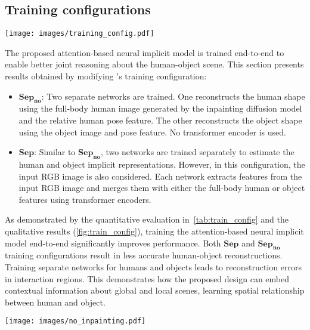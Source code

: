 \subsection{Training configurations}
\begin{table}[h]
\centering
\resizebox{\linewidth}{!}
{}
\vspace{-3mm}
\caption{Quantitative results obtained with different training configurations of \name.}
\label{tab:train_config}
\end{table}
\begin{figure*}[t]
  \centering
\texttt{[image: images/training\_config.pdf]}
\caption{Examples of results obtained with different training configurations of \name. Front and side views are shown from \dataname in the top row, from BEHAVE~\cite{bhatnagar2022behave} in the bottom.}
\label{fig:train_config}
\end{figure*}
\noindent The proposed attention-based neural implicit model is trained end-to-end to enable better joint reasoning about the human-object scene. This section presents results obtained by modifying \name's training configuration:
\begin{itemize}
    \item $\mathbf{Sep_{no}}$: Two separate networks are trained. One reconstructs the human shape using the full-body human image generated by the inpainting diffusion model and the relative human pose feature. The other reconstructs the object shape using the object image and pose feature. No transformer encoder is used.
    \item $\mathbf{Sep}$: Similar to $\mathbf{Sep_{no}}$, two networks are trained separately to estimate the human and object implicit representations. However, in this configuration, the input RGB image is also considered. Each network extracts features from the input RGB image and merges them with either the full-body human or object features using transformer encoders.
\end{itemize}
As demonstrated by the quantitative evaluation in~\cref{tab:train_config} and the qualitative results (\cref{fig:train_config}), training the attention-based neural implicit model end-to-end significantly improves performance. Both $\mathbf{Sep}$ and $\mathbf{Sep_{no}}$ training configurations result in less accurate human-object reconstructions. Training separate networks for humans and objects leads to reconstruction errors in interaction regions. This demonstrates how the proposed design can embed contextual information about global and local scenes, learning spatial relationship between human and object.
\begin{figure*}[t]
  \centering
\texttt{[image: images/no\_inpainting.pdf]}
\vspace{-4mm}
\caption{Effect of not applying the inpainting module of \name before estimating the implicit representation. The same examples used in the paper are illustrated with (w.) and without (w.o) the object.}
\label{fig:no_inp}
\end{figure*}

